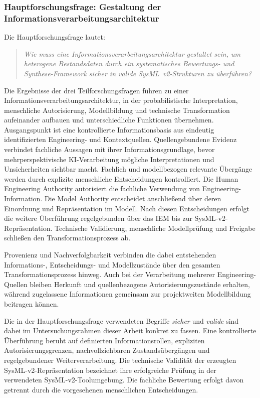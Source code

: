 \subsubsection{Hauptforschungsfrage: Gestaltung der Informationsverarbeitungsarchitektur}
\label{sec:discussion_main_rq}

Die Hauptforschungsfrage lautet:

\begin{quote}
\textit{Wie muss eine Informationsverarbeitungsarchitektur gestaltet sein,
um heterogene Bestandsdaten durch ein systematisches Bewertungs- und
Synthese-Framework sicher in valide SysML~v2-Strukturen zu überführen?}
\end{quote}

Die Ergebnisse der drei Teilforschungsfragen führen zu einer
Informationsverarbeitungsarchitektur, in der probabilistische Interpretation,
menschliche Autorisierung, Modellbildung und technische Transformation
aufeinander aufbauen und unterschiedliche Funktionen übernehmen.
Ausgangspunkt ist eine kontrollierte Informationsbasis aus eindeutig
identifizierten Engineering- und Kontextquellen. Quellengebundene Evidenz
verbindet fachliche Aussagen mit ihrer Informationsgrundlage, bevor
mehrperspektivische KI-Verarbeitung mögliche Interpretationen und
Unsicherheiten sichtbar macht.
\newpage
Fachlich und modellbezogen relevante Übergänge werden durch explizite
menschliche Entscheidungen kontrolliert. Die Human Engineering Authority
autorisiert die fachliche Verwendung von Engineering-Information. Die Model
Authority entscheidet anschließend über deren Einordnung und Repräsentation
im Modell. Nach diesen Entscheidungen erfolgt die weitere Überführung
regelgebunden über das IEM bis zur SysML-v2-Repräsentation. Technische
Validierung, menschliche Modellprüfung und Freigabe schließen den
Transformationsprozess ab.

Provenienz und Nachverfolgbarkeit verbinden die dabei entstehenden
Informations-, Entscheidungs- und Modellzustände über den gesamten
Transformationsprozess hinweg. Auch bei der Verarbeitung mehrerer
Engineering-Quellen bleiben Herkunft und quellenbezogene
Autorisierungszustände erhalten, während zugelassene Informationen gemeinsam
zur projektweiten Modellbildung beitragen können.

Die in der Hauptforschungsfrage verwendeten Begriffe \emph{sicher} und
\emph{valide} sind dabei im Untersuchungsrahmen dieser Arbeit konkret zu
fassen. Eine kontrollierte Überführung beruht auf definierten
Informationsrollen, expliziten Autorisierungsgrenzen, nachvollziehbaren
Zustandsübergängen und regelgebundener Weiterverarbeitung. Die technische
Validität der erzeugten SysML-v2-Repräsentation bezeichnet ihre erfolgreiche
Prüfung in der verwendeten SysML-v2-Toolumgebung. Die fachliche Bewertung
erfolgt davon getrennt durch die vorgesehenen menschlichen Entscheidungen.

